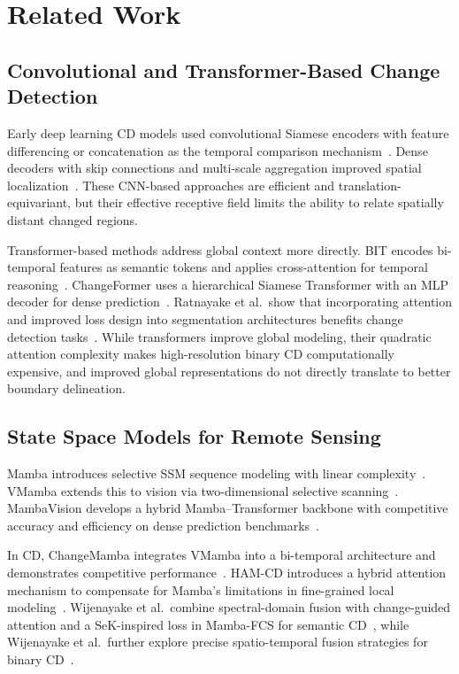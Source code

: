 \section{Related Work}

\subsection{Convolutional and Transformer-Based Change Detection}
Early deep learning CD models used convolutional Siamese encoders with feature differencing or concatenation as the temporal comparison mechanism~\cite{daudt2018fully}. Dense decoders with skip connections and multi-scale aggregation improved spatial localization~\cite{ronneberger2015unet,fang2022snunet,chen2021dasnet}. These CNN-based approaches are efficient and translation-equivariant, but their effective receptive field limits the ability to relate spatially distant changed regions.

Transformer-based methods address global context more directly. BIT encodes bi-temporal features as semantic tokens and applies cross-attention for temporal reasoning~\cite{chen2022bit}. ChangeFormer uses a hierarchical Siamese Transformer with an MLP decoder for dense prediction~\cite{bandara2022changeformer}. Ratnayake et al.\ show that incorporating attention and improved loss design into segmentation architectures benefits change detection tasks~\cite{enhanced_scannet_mercon2025}. While transformers improve global modeling, their quadratic attention complexity makes high-resolution binary CD computationally expensive, and improved global representations do not directly translate to better boundary delineation.

\subsection{State Space Models for Remote Sensing}
Mamba introduces selective SSM sequence modeling with linear complexity~\cite{gu2023mamba}. VMamba extends this to vision via two-dimensional selective scanning~\cite{liu2024vmamba}. MambaVision develops a hybrid Mamba--Transformer backbone with competitive accuracy and efficiency on dense prediction benchmarks~\cite{hatamizadeh2025mambavision}.

In CD, ChangeMamba integrates VMamba into a bi-temporal architecture and demonstrates competitive performance~\cite{chen2024changemamba}. HAM-CD introduces a hybrid attention mechanism to compensate for Mamba's limitations in fine-grained local modeling~\cite{li2026hamcd}. Wijenayake et al.\ combine spectral-domain fusion with change-guided attention and a SeK-inspired loss in Mamba-FCS for semantic CD~\cite{mambafcs}, while Wijenayake et al.\ further explore precise spatio-temporal fusion strategies for binary CD~\cite{precision_spatiotemporal_fusion_iciis2025}.

